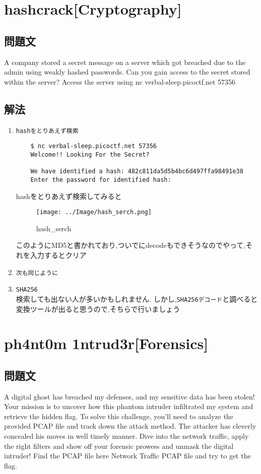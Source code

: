 \documentclass[dvipdfmx]{jsarticle}
\begin{document}
\section{hashcrack[Cryptography]}
\subsection{問題文}
A company stored a secret message on a server which got breached due to the admin using weakly hashed passwords. Can you gain access to the secret stored within the server? Access the server using nc verbal-sleep.picoctf.net 57356

\subsection{解法}
\begin{enumerate}
	\item \texttt{hashをとりあえず検索}
	\begin{verbatim}
	$ nc verbal-sleep.picoctf.net 57356
	Welcome!! Looking For the Secret?

	We have identified a hash: 482c811da5d5b4bc6d497ffa98491e38
	Enter the password for identified hash: 
	\end{verbatim}
	hashをとりあえず検索してみると
	\begin{figure}[h]
	\begin{center}
	\texttt{[image: ../Image/hash\_serch.png]}
	\caption{hash\_serch}
	\end{center}
	\end{figure}
	\FloatBarrier
	このようにMD5と書かれており,ついでにdecodeもできそうなのでやって,それを入力するとクリア
	\item \texttt{次も同じように}
	\item \texttt{SHA256}\\
	検索しても出ない人が多いかもしれません.
	しかし,\texttt{SHA256デコード}と調べると変換ツールが出ると思うので,そちらで行いましょう

\end{enumerate}

\section{ph4nt0m 1ntrud3r[Forensics]}
\subsection{問題文}
A digital ghost has breached my defenses, and my sensitive data has been stolen!  Your mission is to uncover how this phantom intruder infiltrated my system and retrieve the hidden flag. To solve this challenge, you'll need to analyze the provided PCAP file and track down the attack method. The attacker has cleverly concealed his moves in well timely manner. Dive into the network traffic, apply the right filters and show off your forensic prowess and unmask the digital intruder! Find the PCAP file here Network Traffic PCAP file and try to get the flag. 
\end{document}
